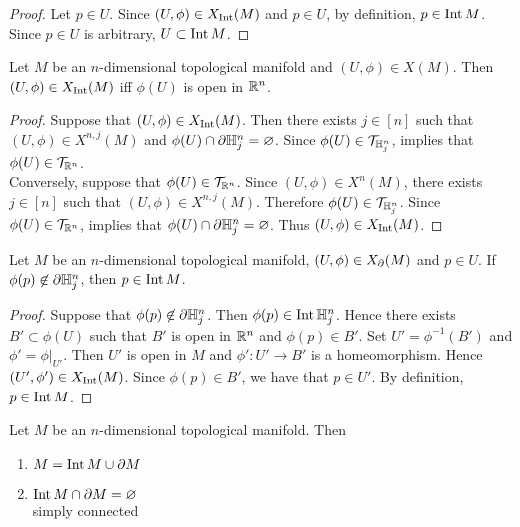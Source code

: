 \documentclass{book}
\begin{document}
	\begin{proof}
		Let $p \in U$. Since $(U, \phi) \in X_{\operatorname{Int}}(M)$ and $p \in U$, by definition, $p \in \operatorname{Int} M$. Since $p \in U$ is arbitrary, $U \subset \operatorname{Int} M$.
	\end{proof}

	\begin{ex} 
		Let $M$ be an $n$-dimensional topological manifold and $(U, \phi) \in X(M)$. Then $(U, \phi) \in X_{\operatorname{Int}}(M)$ iff $\phi(U)$ is open in $\mathbb{R}^n$. 
	\end{ex}
	
	\begin{proof}
		Suppose that $(U, \phi) \in X_{\operatorname{Int}}(M)$. Then there exists $j \in [n]$ such that $(U, \phi) \in X^{n,j}(M)$ and $\phi(U) \cap \partial \mathbb{H}^n_j = \varnothing$. Since $\phi(U) \in \mathcal{T}_{\mathbb{H}^n_j}$,  implies that $\phi(U) \in \mathcal{T}_{\mathbb{R}^n}$.\\ 
		Conversely, suppose that $\phi(U) \in \mathcal{T}_{\mathbb{R}^n}$. Since $(U, \phi) \in X^n(M)$, there exists $j \in [n]$ such that $(U, \phi) \in X^{n,j}(M)$. Therefore $\phi(U) \in \mathcal{T}_{\mathbb{H}^n_j}$. Since $\phi(U) \in \mathcal{T}_{\mathbb{R}^n}$,  implies that $\phi(U) \cap \partial \mathbb{H}^n_j = \varnothing$. Thus $(U, \phi) \in X_{\operatorname{Int}}(M)$.
	\end{proof}

	\begin{ex} 
		Let $M$ be an $n$-dimensional topological manifold, $(U, \phi) \in X_{\partial}(M)$ and $p \in U$. If $\phi(p) \not \in \partial \mathbb{H}^n_j $, then $p \in \operatorname{Int} M$.
	\end{ex}

	\begin{proof}
		Suppose that $\phi(p) \not \in \partial \mathbb{H}^n_j $.  Then  $\phi(p) \in \operatorname{Int} \mathbb{H}^n_j $. Hence there exists $B' \subset \phi(U)$ such that $B'$ is open in $\mathbb{R}^n$ and $\phi(p) \in B'$. Set $U' = \phi^{-1}(B')$ and $\phi' = \phi|_{U'}$. Then $U'$ is open in $M$ and $\phi': U' \rightarrow B'$ is a homeomorphism. Hence $(U', \phi') \in X_{\operatorname{Int}}(M)$. Since $\phi(p) \in B'$, we have that $p \in U'$. By definition, $p \in \operatorname{Int} M$.
	\end{proof}

	\begin{ex} 
		Let $M$ be an $n$-dimensional topological manifold. Then 
		\begin{enumerate}
			\item $M = \operatorname{Int} M \cup \partial M $
			\item $\operatorname{Int} M \cap \partial M = \varnothing$ \\
			 simply connected
		\end{enumerate}
	\end{ex}
\end{document}
